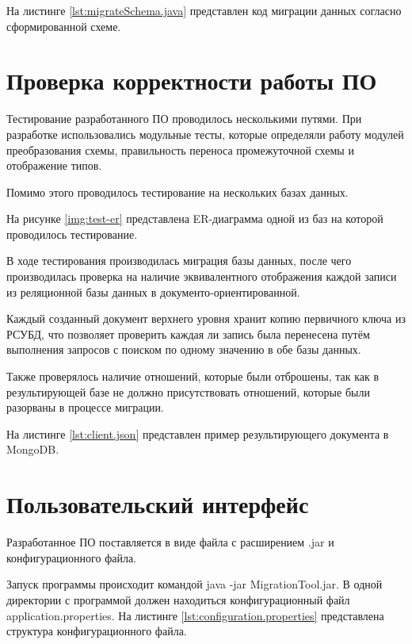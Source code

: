 \clearpage

На листинге \ref{lst:migrateSchema.java} представлен код миграции данных согласно сформированной схеме.

\clearpage
\section{Проверка корректности работы ПО}
Тестирование разработанного ПО проводилось несколькими путями. 
При разработке использовались модульные тесты, 
которые определяли работу модулей преобразования схемы, правильность переноса промежуточной схемы и отображение типов.

Помимо этого проводилось тестирование на нескольких базах данных.

На рисунке \ref{img:test-er} представлена ER-диаграмма одной из баз на которой проводилось тестирование.


\clearpage

В ходе тестирования производилась миграция базы данных, 
после чего производилась проверка на наличие эквивалентного отображения каждой записи из 
реляционной базы данных в документо-ориентированной.

Каждый созданный документ верхнего уровня хранит копию первичного ключа из РСУБД,
что позволяет проверить каждая ли запись была перенесена путём выполнения запросов 
с поиском по одному значению в обе базы данных.

Также проверялось наличие отношений, которые были отброшены, 
так как в результирующей базе не должно присутствовать отношений, 
которые были разорваны в процессе миграции.

На листинге \ref{lst:client.json} представлен пример результирующего документа в MongoDB.


\clearpage


\section{Пользовательский интерфейс}
Разработанное ПО поставляется в виде файла с расширением \textmd{.jar} и конфигурационного файла.

Запуск программы происходит командой \textmd{java -jar MigrationTool.jar}. 
В одной директории с программой должен находиться конфигурационный файл \textmd{application.properties}.
На листинге \ref{lst:configuration.properties} представлена структура конфигурационного файла.

